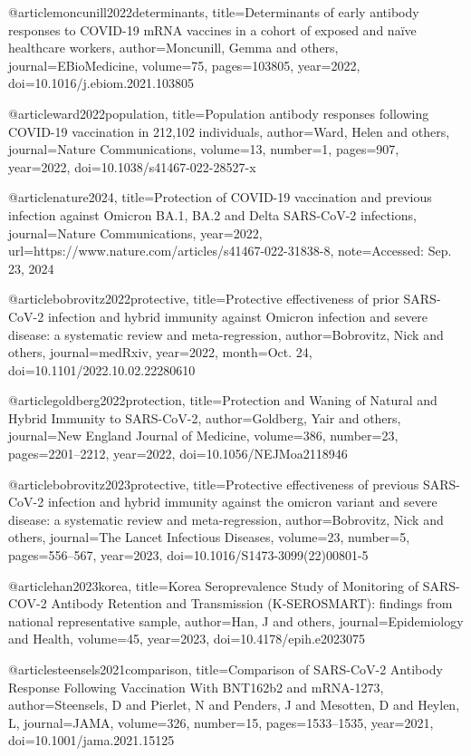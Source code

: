 @article{moncunill2022determinants,
	title={Determinants of early antibody responses to COVID-19 mRNA vaccines in a cohort of exposed and naïve healthcare workers},
	author={Moncunill, Gemma and others},
	journal={EBioMedicine},
	volume={75},
	pages={103805},
	year={2022},
	doi={10.1016/j.ebiom.2021.103805}
}

@article{ward2022population,
	title={Population antibody responses following COVID-19 vaccination in 212,102 individuals},
	author={Ward, Helen and others},
	journal={Nature Communications},
	volume={13},
	number={1},
	pages={907},
	year={2022},
	doi={10.1038/s41467-022-28527-x}
}

@article{nature2024,
	title={Protection of COVID-19 vaccination and previous infection against Omicron BA.1, BA.2 and Delta SARS-CoV-2 infections},
	journal={Nature Communications},
	year={2022},
	url={https://www.nature.com/articles/s41467-022-31838-8},
	note={Accessed: Sep. 23, 2024}
}

@article{bobrovitz2022protective,
	title={Protective effectiveness of prior SARS-CoV-2 infection and hybrid immunity against Omicron infection and severe disease: a systematic review and meta-regression},
	author={Bobrovitz, Nick and others},
	journal={medRxiv},
	year={2022},
	month={Oct. 24},
	doi={10.1101/2022.10.02.22280610}
}

@article{goldberg2022protection,
	title={Protection and Waning of Natural and Hybrid Immunity to SARS-CoV-2},
	author={Goldberg, Yair and others},
	journal={New England Journal of Medicine},
	volume={386},
	number={23},
	pages={2201--2212},
	year={2022},
	doi={10.1056/NEJMoa2118946}
}

@article{bobrovitz2023protective,
	title={Protective effectiveness of previous SARS-CoV-2 infection and hybrid immunity against the omicron variant and severe disease: a systematic review and meta-regression},
	author={Bobrovitz, Nick and others},
	journal={The Lancet Infectious Diseases},
	volume={23},
	number={5},
	pages={556--567},
	year={2023},
	doi={10.1016/S1473-3099(22)00801-5}
}

@article{han2023korea,
	title={Korea Seroprevalence Study of Monitoring of SARS-COV-2 Antibody Retention and Transmission (K-SEROSMART): findings from national representative sample},
	author={Han, J and others},
	journal={Epidemiology and Health},
	volume={45},
	year={2023},
	doi={10.4178/epih.e2023075}
}

@article{steensels2021comparison,
	title={Comparison of SARS-CoV-2 Antibody Response Following Vaccination With BNT162b2 and mRNA-1273},
	author={Steensels, D and Pierlet, N and Penders, J and Mesotten, D and Heylen, L},
	journal={JAMA},
	volume={326},
	number={15},
	pages={1533--1535},
	year={2021},
	doi={10.1001/jama.2021.15125}
}


